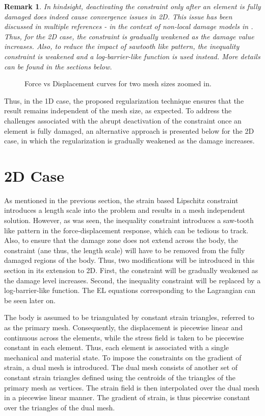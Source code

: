 \documentclass[10pt]{elsarticle}
\newtheorem*{remark}{Remark}
\begin{document}
\begin{remark}
	In hindsight, deactivating the constraint only after an element is fully damaged does indeed cause convergence issues in 2D. This issue has been discussed in multiple references - in the context of non-local damage models in \cite{Geers1998}. Thus, for the 2D case, the constraint is gradually weakened as the damage value increases. Also, to reduce the impact of sawtooth like pattern, the inequality constraint is weakened and a log-barrier-like function is used instead. More details can be found in the sections below.
\end{remark}


\begin{figure}[ht]
	\centering
	
	\caption{Force vs Displacement curves for two mesh sizes zoomed in.}
	\label{force_disp_nonlocal_zoom}
\end{figure}

Thus, in the 1D case, the proposed regularization technique ensures that the result remains independent of the mesh size, as expected. To address the challenges associated with the abrupt deactivation of the constraint once an element is fully damaged, an alternative approach is presented below for the 2D case, in which the regularization is gradually weakened as the damage increases.

\section{2D Case}

As mentioned in the previous section, the strain based Lipschitz constraint introduces a length scale into the problem and results in a mesh independent solution. However, as was seen, the inequality constraint introduces a saw-tooth like pattern in the force-displacement response, which can be tedious to track. Also, to ensure that the damage zone does not extend across the body, the constraint (ane thus, the length scale) will have to be removed from the fully damaged regions of the body. Thus, two modifications will be introduced in this section in its extension to 2D. First, the constraint will be gradually weakened as the damage level increases. Second, the inequality constraint will be replaced by a log-barrier-like function. The EL equations corresponding to the Lagrangian can be seen later on. 

The body is assumed to be triangulated by constant strain triangles, referred to as the primary mesh. Consequently, the displacement is piecewise linear and continuous across the elements, while the stress field is taken to be piecewise constant in each element. Thus, each element is associated with a single mechanical and material state. To impose the constraints on the gradient of strain, a dual mesh is introduced. The dual mesh consists of another set of constant strain triangles defined using the centroids of the triangles of the primary mesh as vertices. The strain field is then interpolated over the dual mesh in a piecewise linear manner. The gradient of strain, is thus piecewise constant over the triangles of the dual mesh.
\end{document}
